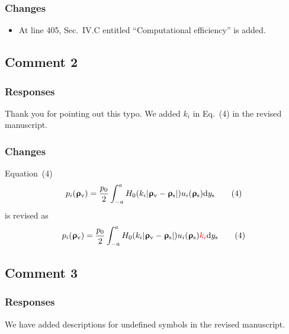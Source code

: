\documentclass{article}
\newcommand{\rev}[1]{{\leavevmode\color{red}#1}}
\begin{document}
\subsubsection*{Changes}
\begin{itemize}
    \item At line 405, 
        Sec.~IV.C entitled ``Computational efficiency'' is added.
\end{itemize}

\subsection{Comment 2}
\lipsum[4]

\subsubsection*{Responses}
Thank you for pointing out this typo. 
We added $k_i$ in Eq.~(4) in the revised manuscript.

\subsubsection*{Changes}
Equation~(4) 
\begin{equation}
    p_i(\bm\uprho_\mathrm{v}) = 
    \frac{p_0}{2}
    \int_{-a}^a H_0(k_i\abs{\bm\uprho_\mathrm{v}-\bm\uprho_\mathrm{s}})
    u_i(\bm\uprho_\mathrm{s}) 
    \dd y_\mathrm{s}
    \tag{4}
\end{equation}
is revised as
\begin{equation}
    p_i(\bm\uprho_\mathrm{v}) = 
    \frac{p_0}{2}
    \int_{-a}^a H_0(k_i\abs{\bm\uprho_\mathrm{v}-\bm\uprho_\mathrm{s}})
    u_i(\bm\uprho_\mathrm{s}) 
    \rev{k_i}
    \dd y_\mathrm{s}
    \tag{4}
\end{equation}



\subsection{Comment 3}
\lipsum[5]

\subsubsection*{Responses}
We have added descriptions for undefined symbols in the revised manuscript.
\end{document}
